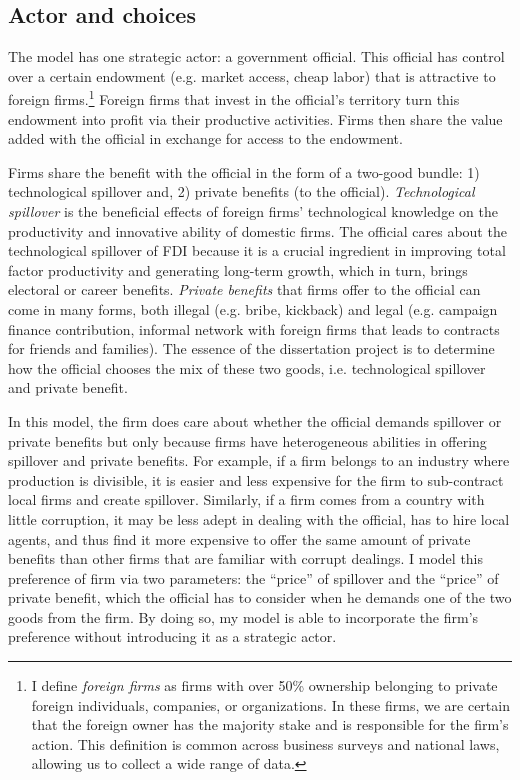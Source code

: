\subsection{Actor and choices}

The model has one strategic actor: a government official. This official has control over a certain endowment (e.g. market access, cheap labor) that is attractive to foreign firms.\footnote{I define \textit{foreign firms} as firms with over 50\% ownership belonging to private foreign individuals, companies, or organizations. In these firms, we are certain that the foreign owner has the majority stake and is responsible for the firm's action. This definition is common across business surveys and national laws, allowing us to collect a wide range of data.} Foreign firms that invest in the official's territory turn this endowment into profit via their productive activities. Firms then share the value added with the official in exchange for access to the endowment. 

Firms share the benefit with the official in the form of a two-good bundle: 1) technological spillover and, 2) private benefits (to the official). \textit{Technological spillover} is the beneficial effects of foreign firms' technological knowledge on the productivity and innovative ability of domestic firms. The official cares about the technological spillover of FDI because it is a crucial ingredient in improving total factor productivity and generating long-term growth, which in turn, brings electoral or career benefits. \textit{Private benefits} that firms offer to the official can come in many forms, both illegal (e.g. bribe, kickback) and legal (e.g. campaign finance contribution, informal network with foreign firms that leads to contracts for friends and families). The essence of the dissertation project is to determine how the official chooses the mix of these two goods, i.e. technological spillover and private benefit.

In this model, the firm does care about whether the official demands spillover or private benefits but only because firms have heterogeneous abilities in offering spillover and private benefits. For example, if a firm belongs to an industry where production is divisible, it is easier and less expensive for the firm to sub-contract local firms and create spillover. Similarly, if a firm comes from a country with little corruption, it may be less adept in dealing with the official, has to hire local agents, and thus find it more expensive to offer the same amount of private benefits than other firms that are familiar with corrupt dealings. I model this preference of firm via two parameters: the ``price'' of spillover and the ``price'' of private benefit, which the official has to consider when he demands one of the two goods from the firm. By doing so, my model is able to incorporate the firm's preference without introducing it as a strategic actor.

